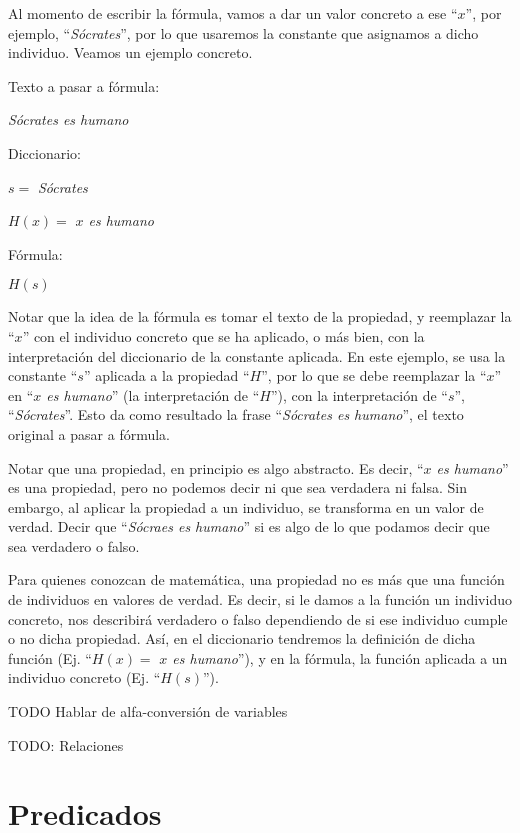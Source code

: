 Al momento de escribir la fórmula, vamos a dar un valor concreto a ese ``$x$'', por ejemplo, ``\textit{Sócrates}'', por lo que usaremos la constante que asignamos a dicho individuo. Veamos un ejemplo concreto.

\begin{example}
    \sindent Texto a pasar a fórmula:

    \dindent \textit{Sócrates es humano}

    \indent Diccionario:

    \sindent $s = $ \textit{Sócrates}

    \sindent $H(x) =$ \textit{$x$ es humano}

    \indent Fórmula:

    \sindent $H(s)$
\end{example}

Notar que la idea de la fórmula es tomar el texto de la propiedad, y reemplazar la ``$x$'' con el individuo concreto que se ha aplicado, o más bien, con la interpretación del diccionario de la constante aplicada. En este ejemplo, se usa la constante ``$s$'' aplicada a la propiedad ``$H$'', por lo que se debe reemplazar la ``$x$'' en ``\textit{$x$ es humano}'' (la interpretación de ``$H$''), con la interpretación de ``$s$'', ``\textit{Sócrates}''. Esto da como resultado la frase ``\textit{Sócrates es humano}'', el texto original a pasar a fórmula.

Notar que una propiedad, en principio es algo abstracto. Es decir, ``\textit{$x$ es humano}'' es una propiedad, pero no podemos decir ni que sea verdadera ni falsa. Sin embargo, al aplicar la propiedad a un individuo, se transforma en un valor de verdad. Decir que ``\textit{Sócraes es humano}'' si es algo de lo que podamos decir que sea verdadero o falso.

Para quienes conozcan de matemática, una propiedad no es más que una función de individuos en valores de verdad. Es decir, si le damos a la función un individuo concreto, nos describirá verdadero o falso dependiendo de si ese individuo cumple o no dicha propiedad. Así, en el diccionario tendremos la definición de dicha función (Ej. ``$H(x) =$ \textit{$x$ es humano}''), y en la fórmula, la función aplicada a un individuo concreto (Ej. ``$H(s)$'').

TODO Hablar de alfa-conversión de variables

TODO: Relaciones

\section{Predicados}
\label{chap:logica_predicados:sec:predicados}

